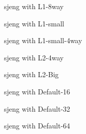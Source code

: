 \documentclass[cacheSimReport.tex]{subfiles}
\begin{document}

\pagebreak
\begin{center}
{\Large{sjeng with L1-8way}}
\end{center}

\pagebreak
\begin{center}
{\Large{sjeng with L1-small}}
\end{center}

\pagebreak
\begin{center}
{\Large{sjeng with L1-small-4way}}
\end{center}

\pagebreak
\begin{center}
{\Large{sjeng with L2-4way}}
\end{center}

\pagebreak
\begin{center}
{\Large{sjeng with L2-Big}}
\end{center}

\pagebreak
\begin{center}
{\Large{sjeng with Default-16}}
\end{center}

\pagebreak
\begin{center}
{\Large{sjeng with Default-32}}
\end{center}

\pagebreak
\begin{center}
{\Large{sjeng with Default-64}}
\end{center}

\pagebreak
\end{document}
